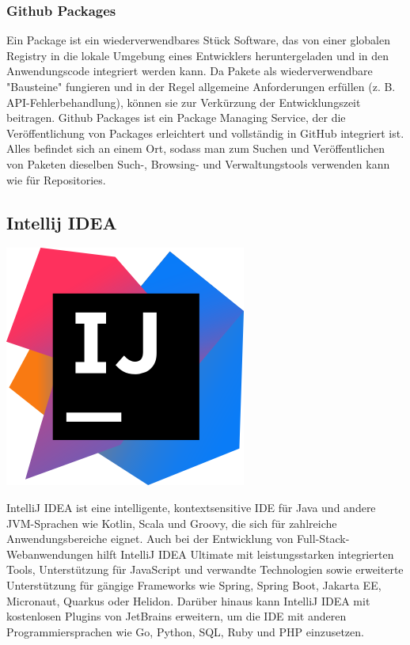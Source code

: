 \subsubsection{Github Packages}

Ein Package ist ein wiederverwendbares Stück Software, das von einer globalen Registry in die lokale Umgebung eines Entwicklers heruntergeladen und 
in den Anwendungscode integriert werden kann. Da Pakete als wiederverwendbare "Bausteine" fungieren und in der Regel allgemeine Anforderungen erfüllen 
(z. B. API-Fehlerbehandlung), können sie zur Verkürzung der Entwicklungszeit beitragen. Github Packages ist ein Package Managing Service, 
der die Veröffentlichung von Packages erleichtert und vollständig in GitHub integriert ist. Alles befindet sich an einem Ort, 
sodass man zum Suchen und Veröffentlichen von Paketen dieselben Such-, Browsing- und Verwaltungstools verwenden kann wie für Repositories.
\cite{sysarch-github-5}

\subsection{Intellij IDEA}
\includegraphics[scale=0.05]{pics/intellijIdeaLogo.png}

IntelliJ IDEA ist eine intelligente, kontextsensitive IDE für Java und andere JVM-Sprachen wie Kotlin, Scala und Groovy, die sich für zahlreiche 
Anwendungsbereiche eignet. Auch bei der Entwicklung von Full-Stack-Webanwendungen hilft IntelliJ IDEA Ultimate mit leistungsstarken integrierten Tools, 
Unterstützung für JavaScript und verwandte Technologien sowie erweiterte Unterstützung für gängige Frameworks wie Spring, Spring Boot, Jakarta EE, Micronaut, 
Quarkus oder Helidon. Darüber hinaus kann IntelliJ IDEA mit kostenlosen Plugins von JetBrains erweitern, um die IDE mit anderen Programmiersprachen wie 
Go, Python, SQL, Ruby und PHP einzusetzen.

